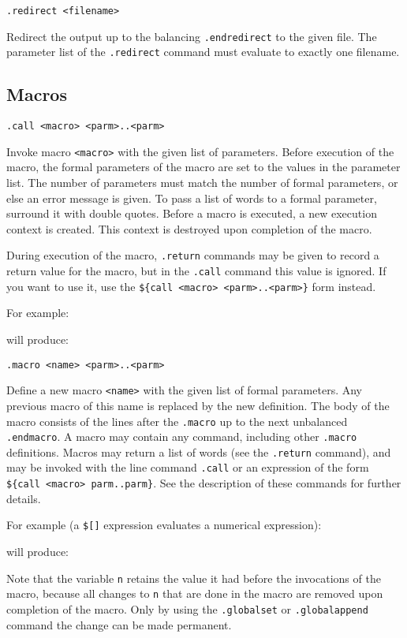 \begin{verbatim}
.redirect <filename>
\end{verbatim}
\begin{desc}
Redirect the output up to the balancing \verb'.endredirect' to the given
file.
The parameter list of the \verb'.redirect' command must evaluate to
exactly one filename.
\end{desc}
\subsection{Macros}
\begin{verbatim}
.call <macro> <parm>..<parm>
\end{verbatim}
\begin{desc}
Invoke macro \verb+<macro>+ with the given list of parameters. Before
execution of the macro, the formal parameters of the macro are set to
the values in the parameter list. The number of parameters must match the
number of formal parameters, or else an error message is given. To pass
a list of words to a formal parameter, surround it with double quotes.
Before a macro is executed, a new execution context is created. This
context is destroyed upon completion of the macro.
\par
During execution of the macro, \verb+.return+ commands may be given to
record a return value for the macro, but in the \verb+.call+ command this
value is ignored.  If you want to use it, use the
\verb+${call <macro> <parm>..<parm>}+ form instead.
\par
For example:

will produce:

\end{desc}
\begin{verbatim}
.macro <name> <parm>..<parm>
\end{verbatim}
\begin{desc}
Define a new macro \verb+<name>+ with the given list of formal parameters.
Any previous macro of this name is replaced by the new definition.
The body of the macro consists of the lines after the
\verb+.macro+ up to the next unbalanced \verb+.endmacro+.
A macro may contain any {\Tm} command, including other \verb+.macro+
definitions.
Macros may return a list of words (see the \verb+.return+ command),
and may be invoked with the line command \verb+.call+ or an expression
of the form \verb+${call <macro> parm..parm}+.
See the description of these commands for further details.
\par
For example (a \verb'$[]' expression evaluates a numerical expression):

will produce:

Note that the variable \verb'n' retains the value it had before the
invocations of the macro, because all changes to \verb'n' that are
done in the macro are removed upon completion of the macro.
Only by using the \verb'.globalset' or \verb'.globalappend' command
the change can be made permanent.
\end{desc}
